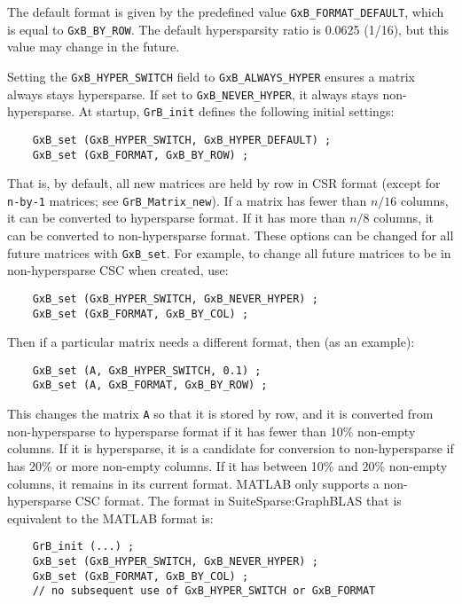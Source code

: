 \documentclass[12pt]{article}
\begin{document}
{The default format is given by the predefined value \verb'GxB_FORMAT_DEFAULT',
which is equal to \verb'GxB_BY_ROW'.
The default hypersparsity
ratio is 0.0625 (1/16), but this value may change in the future.

Setting the \verb'GxB_HYPER_SWITCH' field to \verb'GxB_ALWAYS_HYPER' ensures a matrix
always stays hypersparse.  If set to \verb'GxB_NEVER_HYPER', it always stays
non-hypersparse.  At startup, \verb'GrB_init' defines the following initial
settings:

{\footnotesize
\begin{verbatim}
    GxB_set (GxB_HYPER_SWITCH, GxB_HYPER_DEFAULT) ;
    GxB_set (GxB_FORMAT, GxB_BY_ROW) ;
\end{verbatim} }

That is, by default, all new matrices are held by row in CSR format (except
for \verb'n-by-1' matrices; see \verb'GrB_Matrix_new').
If a matrix has fewer than $n/16$
columns, it can be converted to hypersparse format.  If it has more than $n/8$
columns, it can be converted to non-hypersparse format.  These options can be
changed for all future matrices with \verb'GxB_set'.  For example, to change
all future matrices to be in non-hypersparse CSC when created, use:

{\footnotesize
\begin{verbatim}
    GxB_set (GxB_HYPER_SWITCH, GxB_NEVER_HYPER) ;
    GxB_set (GxB_FORMAT, GxB_BY_COL) ;
\end{verbatim} }

Then if a particular matrix needs a different format, then (as an example):

{\footnotesize
\begin{verbatim}
    GxB_set (A, GxB_HYPER_SWITCH, 0.1) ;
    GxB_set (A, GxB_FORMAT, GxB_BY_ROW) ;
\end{verbatim} }

This changes the matrix \verb'A' so that it is stored by row, and it is
converted from non-hypersparse to hypersparse format if it has fewer than 10\%
non-empty columns.  If it is hypersparse, it is a candidate for conversion to
non-hypersparse if has 20\% or more non-empty columns.  If it has between 10\%
and 20\% non-empty columns, it remains in its current format.
MATLAB only supports a non-hypersparse CSC format.  The format in
SuiteSparse:GraphBLAS that is equivalent to the MATLAB format is:

{\footnotesize
\begin{verbatim}
    GrB_init (...) ;
    GxB_set (GxB_HYPER_SWITCH, GxB_NEVER_HYPER) ;
    GxB_set (GxB_FORMAT, GxB_BY_COL) ;
    // no subsequent use of GxB_HYPER_SWITCH or GxB_FORMAT
\end{verbatim} }

}
\end{document}
